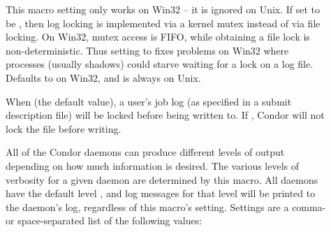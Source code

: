 \begin{description}
\item[] \label{param:FileLockViaMutex} 
  This macro setting only works on Win32 -- it is ignored on Unix.  If set
  to be , then log locking is implemented via a kernel mutex
  instead of via file locking.  On Win32, mutex access is FIFO, while
  obtaining a file lock is non-deterministic.  Thus setting to 
  fixes problems on Win32 where processes (usually shadows) could starve
  waiting for a lock on a log file.  Defaults to  on Win32, and is
  always  on Unix.

\item[] \label{param:EnableUserlogLocking}
  When  (the default value),
  a user's job log (as specified in a submit description file)
  will be locked before being written to.
  If , Condor will not lock the file before writing.

\item[] \label{param:SubsysDebug} All of the
  Condor daemons can produce different levels of output depending on
  how much information is desired.  The various levels of
  verbosity for a given daemon are determined by this macro.  All
  daemons have the default level , and log messages for
  that level will be printed to the daemon's log, regardless of this
  macro's setting.  Settings are a comma- or space-separated list
  of the following values:

\end{description}
